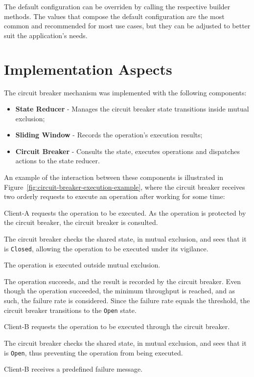The default configuration can be overriden by calling the respective builder methods.
The values that compose the default configuration are the most common and recommended for most use cases, but they can be adjusted to better suit the application's needs.

\section{Implementation Aspects}\label{sec:cbreaker-implementation-aspects}

The circuit breaker mechanism was implemented with the following components:

\begin{itemize}
    \item \textbf{State Reducer} - Manages the circuit breaker state transitions inside mutual exclusion;
    \item \textbf{Sliding Window} - Records the operation's execution results;
    \item \textbf{Circuit Breaker} - Consults the state, executes operations and dispatches actions to the state reducer.
\end{itemize}

An example of the interaction between these components is illustrated in Figure~\ref{fig:circuit-breaker-execution-example},
where the circuit breaker receives two orderly requests to execute an operation after working for some time:

\begin{boldenumerate}
    \item Client-A requests the operation to be executed.
    As the operation is protected by the circuit breaker, the circuit breaker is consulted.
    \item The circuit breaker checks the shared state, in mutual exclusion,
    and sees that it is \texttt{Closed}, allowing the operation to be executed under its vigilance.
    \item The operation is executed outside mutual exclusion.
    \item The operation succeeds, and the result is recorded by the circuit breaker.
    Even though the operation succeeded, the minimum throughput is reached,
    and as such, the failure rate is considered.
    Since the failure rate equals the threshold, the circuit breaker transitions to the \texttt{Open} state.
    \item Client-B requests the operation to be executed through the circuit breaker.
    \item The circuit breaker checks the shared state, in mutual exclusion, and sees that it is \texttt{Open}, thus preventing the operation from being executed.
    \item Client-B receives a predefined failure message.
\end{boldenumerate}

